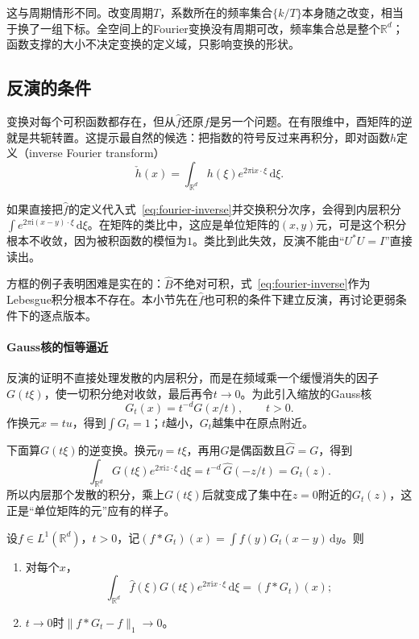 这与周期情形不同。改变周期$T$，系数所在的频率集合$\{k/T\}$本身随之改变，相当于换了一组下标。全空间上的Fourier变换没有周期可改，频率集合总是整个$\mathbb R^d$；函数支撑的大小不决定变换的定义域，只影响变换的形状。

\subsection{反演的条件}
\label{sec:fourier-l1-inversion}

变换对每个可积函数都存在，但从$\widehat f$还原$f$是另一个问题。在有限维中，酉矩阵的逆就是共轭转置。这提示最自然的候选：把指数的符号反过来再积分，即对函数$h$定义（inverse Fourier transform）
\begin{equation}
\check h(x)=\int_{\mathbb R^d}h(\xi)e^{2\pi\mathrm ix\cdot\xi}\,\mathrm d\xi .
\label{eq:fourier-inverse}
\end{equation}

如果直接把$\widehat f$的定义代入式~\eqref{eq:fourier-inverse}并交换积分次序，会得到内层积分$\int e^{2\pi\mathrm i(x-y)\cdot\xi}\,\mathrm d\xi$。在矩阵的类比中，这应是单位矩阵的$(x,y)$元，可是这个积分根本不收敛，因为被积函数的模恒为$1$。类比到此失效，反演不能由“$U^*U=I$”直接读出。

方框的例子表明困难是实在的：$\widehat B$不绝对可积，式~\eqref{eq:fourier-inverse}作为Lebesgue积分根本不存在。本小节先在$\widehat f$也可积的条件下建立反演，再讨论更弱条件下的逐点版本。

\paragraph{Gauss核的恒等逼近}

反演的证明不直接处理发散的内层积分，而是在频域乘一个缓慢消失的因子$G(t\xi)$，使一切积分绝对收敛，最后再令$t\to0$。为此引入缩放的Gauss核
\[
G_t(x)=t^{-d}G(x/t),\qquad t>0.
\]
作换元$x=tu$，得到$\int G_t=1$；$t$越小，$G_t$越集中在原点附近。

下面算$G(t\xi)$的逆变换。换元$\eta=t\xi$，再用$G$是偶函数且$\widehat G=G$，得到
\begin{equation}
\int_{\mathbb R^d}G(t\xi)e^{2\pi\mathrm iz\cdot\xi}\,\mathrm d\xi=t^{-d}\,\widehat G(-z/t)=G_t(z).
\label{eq:fourier-gauss-kernel-inverse}
\end{equation}
所以内层那个发散的积分，乘上$G(t\xi)$后就变成了集中在$z=0$附近的$G_t(z)$，这正是“单位矩阵的元”应有的样子。

\begin{lemma}[Gauss核的恒等逼近]
\label{lem:fourier-gauss-approx}
设$f\in L^1(\mathbb R^d)$，$t>0$，记$(f*G_t)(x)=\int f(y)G_t(x-y)\,\mathrm dy$。则
\begin{enumerate}
\item 对每个$x$，
\begin{equation}
\int_{\mathbb R^d}\widehat f(\xi)G(t\xi)e^{2\pi\mathrm ix\cdot\xi}\,\mathrm d\xi=(f*G_t)(x);
\label{eq:fourier-gauss-regularized}
\end{equation}
\item $t\to0$时$\lVert f*G_t-f\rVert_1\to0$。
\end{enumerate}
\end{lemma}


